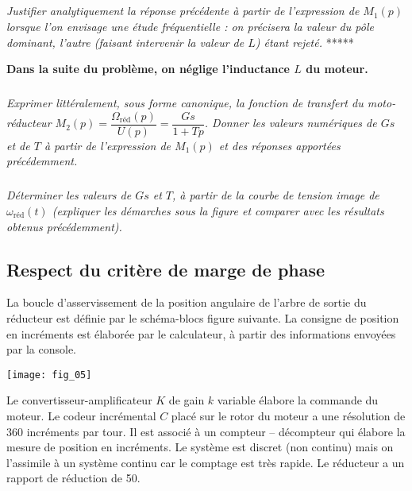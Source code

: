 \begin{multicols}{2}
\subparagraph{}\textit{Justifier analytiquement la réponse précédente à partir de l’expression de $M_1(p)$ lorsque l’on envisage une étude fréquentielle : on précisera la valeur du pôle dominant, l’autre (faisant intervenir la valeur de $L$) étant rejeté.}
*****
\ifprof
\begin{corrige}
\end{corrige}
\else
\fi

\textbf{Dans la suite du problème, on néglige l’inductance $L$ du moteur.}

\subparagraph{}\textit{Exprimer littéralement, sous forme canonique, la fonction de transfert du moto-réducteur  $M_2(p)=\dfrac{\Omega_{\text{réd}}(p)}{U(p)}=\dfrac{Gs}{1+Tp}$.  
Donner les valeurs numériques de $Gs$ et de $T$ à partir de l’expression de $M_1(p)$ et des réponses apportées précédemment.}
\ifprof
\begin{corrige}
\end{corrige}
\else
\fi


\subparagraph{}\textit{Déterminer les valeurs de $Gs$ et $T$, à partir de la courbe de tension image de $\omega_{\text{réd}}(t)$  (expliquer les démarches sous la figure et comparer avec les résultats obtenus précédemment). }
\ifprof
\begin{corrige}
\end{corrige}
\else
\fi

\subsection*{Respect du critère de marge de phase}
La boucle d’asservissement de la position angulaire de l’arbre de sortie du réducteur est définie par le schéma-blocs figure suivante. 
La consigne de position en incréments est élaborée par le  calculateur, à partir des informations envoyées par la console.

\begin{center}
\texttt{[image: fig\_05]}
\end{center}


Le convertisseur-amplificateur $K$ de gain $k$ variable élabore la commande du moteur.
Le codeur incrémental $C$ placé sur le rotor du moteur a une résolution de 360 incréments par tour. Il est associé à un compteur -- décompteur qui élabore la mesure de position en incréments. 
Le système est discret (non continu) mais on l’assimile à un système continu car le comptage est très rapide. 
Le réducteur a un rapport de réduction de 50.
 

\end{multicols}
